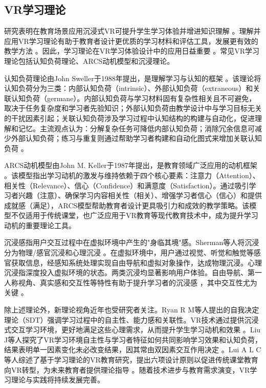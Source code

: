 \documentclass[runningheads]{llncs}
\begin{document}
\subsection{}
\subsection{VR学习理论}
研究表明在教育场景应用沉浸式VR可提升学生学习体验并增进知识理解 \cite{freina2015literature}。理解并应用VR学习理论有助于教育者设计更优质的学习材料和评估工具，发展更有效的教学方法 \cite{matovu2023immersive}。因此，学习理论在VR学习体验设计中的应用日益重要 \cite{marougkas2023virtual}。常见VR学习理论包括认知负荷理论、ARCS动机模型和沉浸理论。

认知负荷理论由John Sweller于1988年提出，是理解学习与认知的框架 \cite{sweller1988cognitive}。该理论将认知负荷分为三类：内部认知负荷（intrinsic）、外部认知负荷（extraneous）和关联认知负荷（germane）。内部认知负荷与学习材料固有复杂性相关且不可避免，取决于任务复杂度和学习者先验知识；外部认知负荷由教学设计中与学习目标无关的干扰因素引起；关联认知负荷涉及学习过程中认知结构的构建与自动化，促进理解和记忆。主流观点认为：分解复杂任务可降低内部认知负荷；消除冗余信息可减少外部认知负荷；练习与重复则通过帮助学习者构建和自动化图式来增加关联认知负荷 \cite{baceviciute2022investigating}。

ARCS动机模型由John M. Keller于1987年提出，是教育领域广泛应用的动机框架 \cite{keller1987development}。该模型指出学习动机的激发与维持依赖于四个核心要素：注意力（Attention）、相关性（Relevance）、信心（Confidence）和满意度（Satisfaction）。通过吸引学习者兴趣（注意）、确保学习内容相关性（相关）、增强学习者信心（信心）和提供成就感（满足），ARCS模型帮助教育者设计更具吸引力和成效的教学策略。该模型不仅适用于传统课堂，也广泛应用于VR教育等现代教育技术中，成为提升学习动机的重要理论工具。

沉浸感指用户交互过程中在虚拟环境中产生的"身临其境"感。Sherman等人将沉浸分为物理/感官沉浸和心理沉浸 \cite{sherman2003understanding}。在虚拟环境中，用户通过视觉、听觉和触觉等感官获取信息，经感知系统处理实现自由导航和虚拟对象操作，达成物理沉浸。心理沉浸指深度投入虚拟环境的状态。两类沉浸均显著影响用户体验。自由导航、第一人称视角、真实感和交互性等特性有助于提升学习者的沉浸感 \cite{regenbrecht2002real,mikropoulos2006presence}，其中交互性尤为关键 \cite{schubert2001experience}。

除上述理论外，新理论视角近年也受研究者关注。Ryan R M等人提出的自我决定理论（SDT）强调学习过程中的自主性、能力感和关联性。VR技术通过提供沉浸式交互学习环境，更好地满足这些心理需求，从而提升学生学习动机和效果 \cite{ryan2024self}。Liu J等人探究了VR学习环境自主性与学习者特征如何共同影响学习效果和认知负荷，结果表明单一因素变化未必改变结果，因其常由双因素交互作用决定 \cite{liu2024autonomy}。Lui A L C等人综述了基于学习理论的VR教育研究，提出六项设计原则以促进传统课堂教育向VR转型，为未来教育者提供理论指导 \cite{lui2023theory}。随着技术进步与教育需求演变，VR学习理论与实践将持续发展完善。
\end{document}
